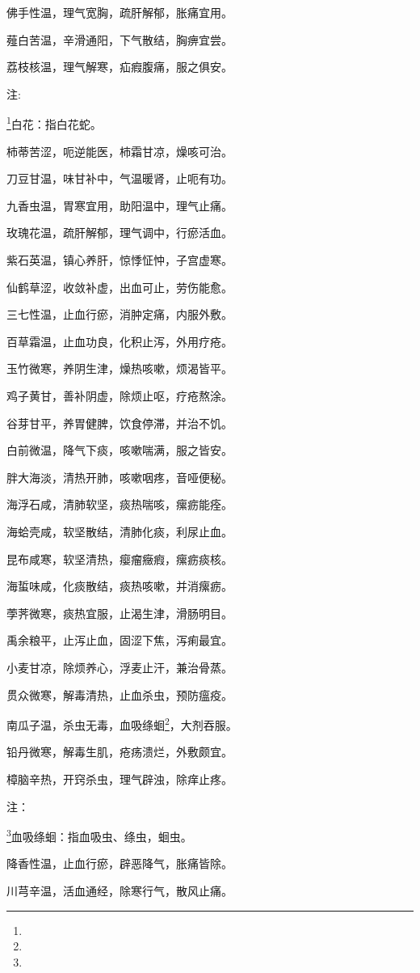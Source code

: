 \documentclass[a4paper,12pt,UTF8,twoside]{ctexbook}
\begin{document}
佛手性温，理气宽胸，疏肝解郁，胀痛宜用。

薤白苦温，辛滑通阳，下气散结，胸痹宜尝。

荔枝核温，理气解寒，疝瘕腹痛，服之俱安。

注:

\footnote{}白花：指白花蛇。

柿蒂苦涩，呃逆能医，柿霜甘凉，燥咳可治。

刀豆甘温，味甘补中，气温暖肾，止呃有功。

九香虫温，胃寒宜用，助阳温中，理气止痛。

玫瑰花温，疏肝解郁，理气调中，行瘀活血。

紫石英温，镇心养肝，惊悸怔忡，子宫虚寒。

仙鹤草涩，收敛补虚，出血可止，劳伤能愈。

三七性温，止血行瘀，消肿定痛，内服外敷。

百草霜温，止血功良，化积止泻，外用疗疮。

玉竹微寒，养阴生津，燥热咳嗽，烦渴皆平。

鸡子黄甘，善补阴虚，除烦止呕，疗疮熬涂。

谷芽甘平，养胃健脾，饮食停滞，并治不饥。

白前微温，降气下痰，咳嗽喘满，服之皆安。

胖大海淡，清热开肺，咳嗽咽疼，音哑便秘。

海浮石咸，清肺软坚，痰热喘咳，瘰疬能痊。

海蛤壳咸，软坚散结，清肺化痰，利尿止血。

昆布咸寒，软坚清热，瘿瘤癥瘕，瘰疬痰核。

海蜇味咸，化痰散结，痰热咳嗽，并消瘰疬。

荸荠微寒，痰热宜服，止渴生津，滑肠明目。

禹余粮平，止泻止血，固涩下焦，泻痢最宜。

小麦甘凉，除烦养心，浮麦止汗，兼治骨蒸。

贯众微寒，解毒清热，止血杀虫，预防瘟疫。

南瓜子温，杀虫无毒，血吸绦蛔\footnote{}，大剂吞服。

铅丹微寒，解毒生肌，疮疡溃烂，外敷颇宜。

樟脑辛热，开窍杀虫，理气辟浊，除痒止疼。

注：

\footnote{}血吸绦蛔：指血吸虫、绦虫，蛔虫。

降香性温，止血行瘀，辟恶降气，胀痛皆除。

川芎辛温，活血通经，除寒行气，散风止痛。
\end{document}
